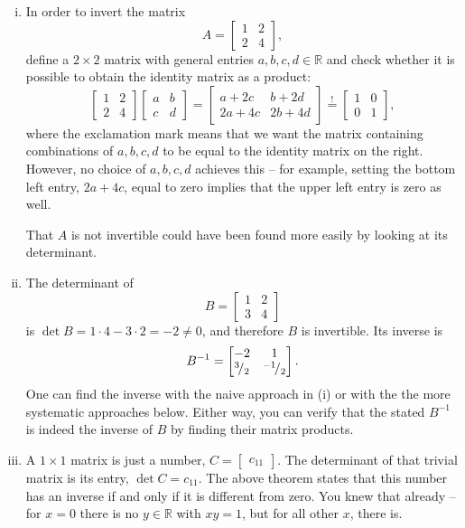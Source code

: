 \begin{example}
\label{expl:inverses}
\begin{enumerate}[(i)]
	\item In order to invert the matrix 
\[ A = \begin{bmatrix}
1 & 2 \\ 2 & 4 \end{bmatrix}, \]
	define a $2 \times 2$ matrix with general entries $a,b,c,d\in\mathbb{R}$ and check whether it is possible to obtain the identity matrix as a product:
\[ \begin{bmatrix}
1 & 2 \\ 2 & 4 \end{bmatrix} \begin{bmatrix}
a & b \\ c & d \end{bmatrix} = \begin{bmatrix}
a+2c & b+2d \\ 2a+4c & 2b+4d \end{bmatrix} \stackrel{\text{!}}{=} \begin{bmatrix}
1 & 0 \\ 0 & 1 \end{bmatrix}, \]
where the exclamation mark means that we want the matrix containing combinations of $a,b,c,d$ to be equal to the identity matrix on the right. However, no choice of $a,b,c,d$ achieves this -- for example, setting the bottom left entry, $2a+4c$, equal to zero implies that the upper left entry is zero as well.

	That $A$ is not invertible could have been found more easily by looking at its determinant.
	\item The determinant of
	\[ B = \begin{bmatrix}
	1 & 2 \\ 3 & 4 \end{bmatrix} \]
	is $\det B = 1\cdot4-3\cdot2=-2\not=0$, and therefore $B$ is invertible. Its inverse is
	\[ B^{-1} = \begin{bmatrix}
	-2 & 1 \\ {}^{3}\!/_{2} & {}^{-1}\!/_{2} \end{bmatrix}. \]
	One can find the inverse with the naive approach in (i) or with the the more systematic approaches below. Either way, you can verify that the stated $B^{-1}$ is indeed the inverse of $B$ by finding their matrix products.
	\item A $1 \times 1$ matrix is just a number, $C=\begin{bmatrix}
	c_{11} \end{bmatrix}$. The determinant of that trivial matrix is its entry, $\det C = c_{11}$. The above theorem states that this number has an inverse if and only if it is different from zero. You knew that already -- for $x=0$ there is no $y\in\mathbb{R}$ with $xy=1$, but for all other $x$, there is.
\end{enumerate}
\end{example}

